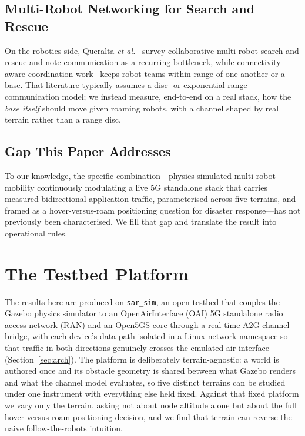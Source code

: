 \documentclass[conference]{IEEEtran}
\begin{document}
\subsection{Multi-Robot Networking for Search and Rescue}
On the robotics side, Queralta \emph{et al.}~\cite{queralta2020collaborative} survey
collaborative multi-robot search and rescue and note communication as a recurring
bottleneck, while connectivity-aware coordination
work~\cite{queralta2020collaborative} keeps robot teams within range of one another or
a base. That literature typically assumes a disc- or exponential-range communication
model; we instead measure, end-to-end on a real stack, how the \emph{base itself}
should move given roaming robots, with a channel shaped by real terrain rather than a
range disc.

\subsection{Gap This Paper Addresses}
To our knowledge, the specific combination---physics-simulated multi-robot mobility
continuously modulating a live 5G standalone stack that carries measured bidirectional
application traffic, parameterised across five terrains, and framed as a
hover-versus-roam positioning question for disaster response---has not previously been
characterised. We fill that gap and translate the result into operational rules.

\section{The Testbed Platform}
\label{sec:program}
The results here are produced on \texttt{sar\_sim}, an open testbed that couples the
Gazebo physics simulator to an OpenAirInterface (OAI) 5G standalone radio access
network (RAN) and an Open5GS core through a real-time A2G channel bridge, with each
device's data path isolated in a Linux network namespace so that traffic in both
directions genuinely crosses the emulated air interface (Section~\ref{sec:arch}). The
platform is deliberately terrain-agnostic: a world is authored once and its obstacle
geometry is shared between what Gazebo renders and what the channel model evaluates,
so five distinct terrains can be studied under one instrument with everything else
held fixed. Against that fixed platform we vary only the terrain, asking not about
node altitude alone but about the full hover-versus-roam positioning decision, and we
find that terrain can reverse the naive follow-the-robots intuition.
\end{document}
